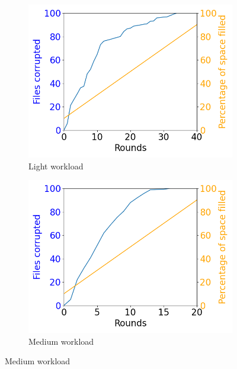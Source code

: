 \documentclass[a4paper,11pt,oneside]{report}
\begin{document}
\begin{figure}[ht]
     \centering
     \begin{subfigure}[b]{0.3\textwidth}
         \centering
         \includegraphics[width=\textwidth]{Figures/average_checksum_corrupt_1MB.png}
         \caption{Light workload}
         \label{fig:checksum_light}
     \end{subfigure}
     \hfill
     \begin{subfigure}[b]{0.3\textwidth}
         \centering
         \includegraphics[width=\textwidth]{Figures/average_checksum_corrupt_2MB.png}
         \caption{Medium workload}
         \label{fig:checksum_medium}
     \end{subfigure}
     \hfill

\end{figure}
\end{document}
